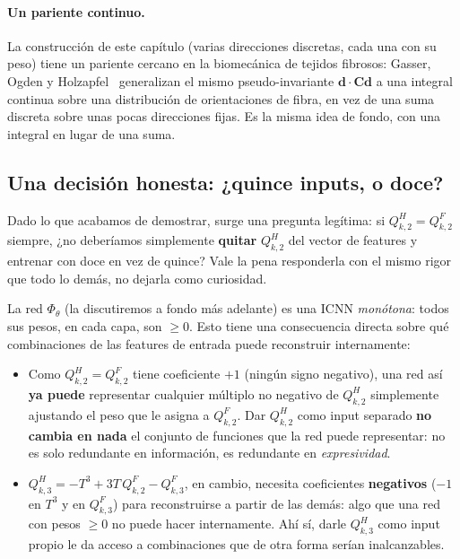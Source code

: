 \documentclass[11pt,a4paper]{article}
\begin{document}
\paragraph{Un pariente continuo.} La construcci\'on de este cap\'itulo
(varias direcciones discretas, cada una con su peso) tiene un pariente
cercano en la biomec\'anica de tejidos fibrosos: Gasser, Ogden y
Holzapfel~\cite{Gasser2006} generalizan el mismo pseudo-invariante
$\bm d\cdot\bm C\bm d$ a una integral continua sobre una distribuci\'on
de orientaciones de fibra, en vez de una suma discreta sobre unas pocas
direcciones fijas. Es la misma idea de fondo, con una integral en lugar
de una suma.

\subsection{Una decisi\'on honesta: ¿quince inputs, o doce?}
\label{sec:appB-15-or-12}

Dado lo que acabamos de demostrar, surge una pregunta leg\'itima:
si $Q_{k,2}^H=Q_{k,2}^F$ siempre, ¿no deber\'iamos simplemente
\textbf{quitar} $Q_{k,2}^H$ del vector de features y entrenar con doce
en vez de quince? Vale la pena responderla con el mismo rigor que todo
lo dem\'as, no dejarla como curiosidad.

La red $\Phi_\theta$ (la discutiremos a fondo m\'as adelante) es una
ICNN \emph{mon\'otona}: todos sus pesos, en cada capa, son
$\geq0$. Esto tiene una consecuencia directa sobre qu\'e combinaciones
de las features de entrada puede reconstruir internamente:
\begin{itemize}
\item Como $Q_{k,2}^H=Q_{k,2}^F$ tiene coeficiente $+1$ (ning\'un
signo negativo), una red as\'i \textbf{ya puede} representar
cualquier m\'ultiplo no negativo de $Q_{k,2}^H$ simplemente ajustando
el peso que le asigna a $Q_{k,2}^F$. Dar $Q_{k,2}^H$ como input
separado \textbf{no cambia en nada} el conjunto de funciones que la
red puede representar: no es solo redundante en informaci\'on, es
redundante en \emph{expresividad}.
\item $Q_{k,3}^H=-T^3+3T\,Q_{k,2}^F-Q_{k,3}^F$, en cambio, necesita
coeficientes \textbf{negativos} ($-1$ en $T^3$ y en $Q_{k,3}^F$) para
reconstruirse a partir de las dem\'as: algo que una red con pesos
$\geq0$ no puede hacer internamente. Ah\'i s\'i, darle $Q_{k,3}^H$
como input propio le da acceso a combinaciones que de otra forma
ser\'ian inalcanzables.
\end{itemize}
\end{document}
